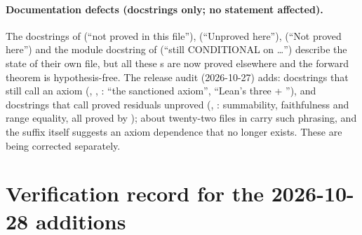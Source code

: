 \paragraph{Documentation defects (docstrings only; no statement affected).} The docstrings of  (``not proved in this file''),
 (``Unproved here''),  (``Not proved here'') and the module docstring of
 (``still CONDITIONAL on \ldots'') describe the state of their own file, but all these
s are now proved elsewhere and the forward theorem is hypothesis-free. The release audit (2026-10-27) adds: docstrings that still call  an axiom
(, , : ``the
sanctioned axiom'', ``Lean's three + ''), and docstrings that call proved residuals unproved
(, : summability, faithfulness and range equality, all
proved by ); about twenty-two files in  carry such phrasing, and the
 suffix itself suggests an axiom dependence that no longer exists. These are being corrected separately.

\section{Verification record for the 2026-10-28 additions}\label{l21:sec:verify}

